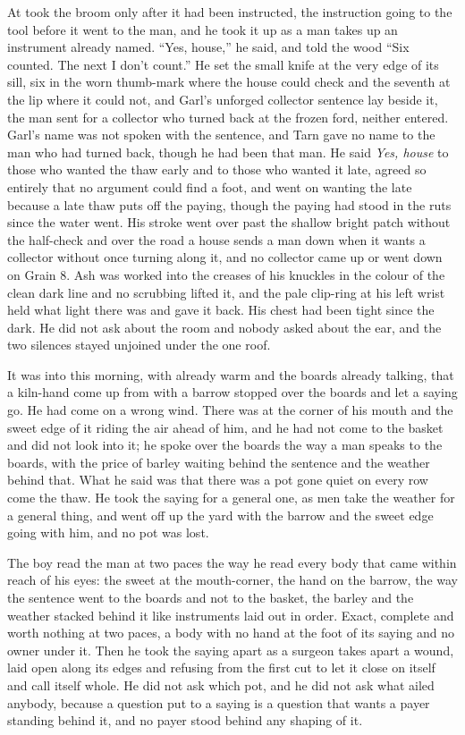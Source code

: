 At   took the broom only after it had been instructed, the instruction going to the tool before it went to the man, and he took it up as a man takes up an instrument already named. “Yes, house,” he said, and told the wood “Six counted. The next I don't count.” He set the small knife at the very edge of its sill, six in the worn thumb-mark where the house could check and the seventh at the lip where it could not, and Garl's unforged collector sentence lay beside it, the man sent for a collector who turned back at the frozen ford, neither entered. Garl's name was not spoken with the sentence, and Tarn gave no name to the man who had turned back, though he had been that man. He said \emph{Yes, house} to those who wanted the thaw early and to those who wanted it late, agreed so entirely that no argument could find a foot, and went on wanting the late because a late thaw puts off the paying, though the paying had stood in the ruts since the water went. His stroke went over  past the shallow bright patch without the half-check and over the road a house sends a man down when it wants a collector without once turning along it, and no collector came up or went down  on Grain 8. Ash was worked into the creases of his knuckles in the colour of the clean dark line and no scrubbing lifted it, and the pale clip-ring at his left wrist held what light there was and gave it back. His chest had been tight since the dark. He did not ask about the room and nobody asked about the ear, and the two silences stayed unjoined under the one roof.

\scenebreak

It was into this morning, with  already warm and the boards already talking, that a kiln-hand come up from  with a barrow stopped over the boards and let a saying go. He had come on a wrong wind. There was  at the corner of his mouth and the sweet edge of it riding the air ahead of him, and he had not come to the basket and did not look into it; he spoke over the boards the way a man speaks to the boards, with the price of barley waiting behind the sentence and the weather behind that. What he said was that there was a pot gone quiet on every row come the thaw. He took the saying for a general one, as men take the weather for a general thing, and went off up the yard with the barrow and the sweet edge going with him, and no pot was lost.

The boy read the man at two paces the way he read every body that came within reach of his eyes: the sweet at the mouth-corner, the hand on the barrow, the way the sentence went to the boards and not to the basket, the barley and the weather stacked behind it like instruments laid out in order. Exact, complete and worth nothing at two paces, a body with no hand at the foot of its saying and no owner under it. Then he took the saying apart as a surgeon takes apart a wound, laid open along its edges and refusing from the first cut to let it close on itself and call itself whole. He did not ask which pot, and he did not ask what ailed anybody, because a question put to a saying is a question that wants a payer standing behind it, and no payer stood behind any shaping of it.

